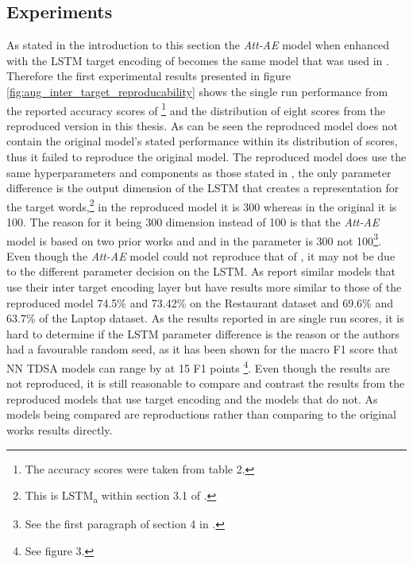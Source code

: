 \subsection{Experiments}
As stated in the introduction to this section the \textit{Att-AE} model when enhanced with the LSTM target encoding of \citet{hazarika-etal-2018-modeling} becomes the same model that was used in \citet{hazarika-etal-2018-modeling}. Therefore the first experimental results presented in figure \ref{fig:aug_inter_target_reproducability} shows the single run performance from the reported accuracy scores of \citet{hazarika-etal-2018-modeling}\footnote{The accuracy scores were taken from table 2.} and the distribution of eight scores from the reproduced version in this thesis. As can be seen the reproduced model does not contain the original model's stated performance within its distribution of scores, thus it failed to reproduce the original model. The reproduced model does use the same hyperparameters and components as those stated in \citet{hazarika-etal-2018-modeling}, the only parameter difference is the output dimension of the LSTM that creates a representation for the target words,\footnote{This is LSTM\textsubscript{a} within section 3.1 of \citet{hazarika-etal-2018-modeling}.} in the reproduced model it is 300 whereas in the original it is 100. The reason for it being 300 dimension instead of 100 is that the \textit{Att-AE} model is based on two prior works \citet{hazarika-etal-2018-modeling} and \citet{wang-etal-2016-attention} and in \citet{wang-etal-2016-attention} the parameter is 300 not 100\footnote{See the first paragraph of section 4 in \citet{wang-etal-2016-attention}.}. Even though the \textit{Att-AE} model could not reproduce that of \citet{hazarika-etal-2018-modeling}, it may not be due to the different parameter decision on the LSTM. As \citet{hazarika-etal-2018-modeling} report similar models that use their inter target encoding layer but have results more similar to those of the reproduced model 74.5\% and 73.42\% on the Restaurant dataset and 69.6\% and 63.7\% of the Laptop dataset. As the results reported in \citet{hazarika-etal-2018-modeling} are single run scores, it is hard to determine if the LSTM parameter difference is the reason or the authors had a favourable random seed, as it has been shown for the macro F1 score that NN TDSA models can range by at 15 F1 points \citep{moss-etal-2019-fiesta}\footnote{See figure 3.}. Even though the results are not reproduced, it is still reasonable to compare and contrast the results from the reproduced models that use target encoding and the models that do not. As models being compared are reproductions rather than comparing to the original works results directly. 

